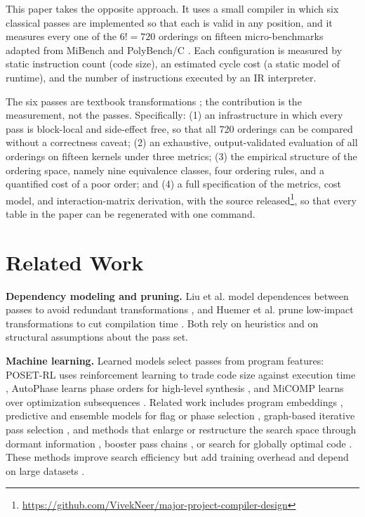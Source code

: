 \documentclass[conference]{IEEEtran}
\begin{document}
This paper takes the opposite approach. It uses a small compiler in which six classical passes are implemented so that each is valid in any position, and it measures every one of the $6! = 720$ orderings on fifteen micro-benchmarks adapted from MiBench \cite{ref32} and PolyBench/C \cite{ref31}. Each configuration is measured by static instruction count (code size), an estimated cycle cost (a static model of runtime), and the number of instructions executed by an IR interpreter.

The six passes are textbook transformations \cite{ref18,ref21}; the contribution is the measurement, not the passes. Specifically: (1) an infrastructure in which every pass is block-local and side-effect free, so that all 720 orderings can be compared without a correctness caveat; (2) an exhaustive, output-validated evaluation of all orderings on fifteen kernels under three metrics; (3) the empirical structure of the ordering space, namely nine equivalence classes, four ordering rules, and a quantified cost of a poor order; and (4) a full specification of the metrics, cost model, and interaction-matrix derivation, with the source released\footnote{\url{https://github.com/VivekNeer/major-project-compiler-design}}, so that every table in the paper can be regenerated with one command.

\section{Related Work}

\textbf{Dependency modeling and pruning.} Liu et al. model dependences between passes to avoid redundant transformations \cite{ref1}, and Huemer et al. prune low-impact transformations to cut compilation time \cite{ref4}. Both rely on heuristics and on structural assumptions about the pass set.

\textbf{Machine learning.} Learned models select passes from program features: POSET-RL uses reinforcement learning to trade code size against execution time \cite{ref8}, AutoPhase learns phase orders for high-level synthesis \cite{ref12}, and MiCOMP learns over optimization subsequences \cite{ref15}. Related work includes program embeddings \cite{ref9}, predictive and ensemble models for flag or phase selection \cite{ref17,ref22,ref28,ref29}, graph-based iterative pass selection \cite{ref20}, and methods that enlarge or restructure the search space through dormant information \cite{ref2,ref26}, booster pass chains \cite{ref25}, or search for globally optimal code \cite{ref3}. These methods improve search efficiency but add training overhead and depend on large datasets \cite{ref8,ref12,ref15}.
\end{document}
